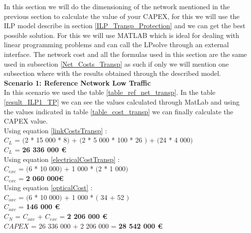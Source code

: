 In this section we will do the dimensioning of the network mentioned in the previous section to calculate the value of your CAPEX, for this we will use the ILP model describe in section \ref{ILP_Transp_Protection} and we can get the best possible solution.
For this we will use MATLAB which is ideal for dealing with linear programming problems and can call the LPsolve through an external interface.
The network cost and all the formulas used in this section are the same used in subsection \ref{Net_Costs_Transp} as such if only we will mention one subsection where with the results obtained through the described model.\\


\textbf{Scenario 1: Reference Network Low Traffic} \label{Scenario1_transp} \\

In this scenario we used the table \ref{table_ref_net_transp}. In the table \ref{result_ILP1_TP} we can see the values calculated through MatLab and using the values indicated in table \ref{table_cost_transp} we can finally calculate the CAPEX value. \\

Using equation \ref{linkCostsTransp} : \\
$C_L$ = $($2 * 15 000 * 8$)$ + $($2 * 5 000 * 100 * 26 $)$ + $($24 * 4 000$)$ \\
$C_L$ = \textbf{26 336 000 \euro} \\

Using equation \ref{electricalCostTransp} : \\
$C_{exc}$ = $($6 * 10 000$)$ + 1 000 * $($2 * 1 000$)$ \\
$C_{exc}$ = \textbf{2 060 000\euro} \\

Using equation \ref{opticalCost} : \\
$C_{oxc}$ = $($6 * 10 000$)$ + 1 000 * $($ 34 + 52 $)$ \\
$C_{oxc}$ = \textbf{146 000 \euro} \\
$C_N$ = $C_{oxc}$ + $C_{exc}$ = \textbf{2 206 000 \euro} \\

$CAPEX$ = 26 336 000 + 2 206 000 = \textbf{28 542 000 \euro}\\

